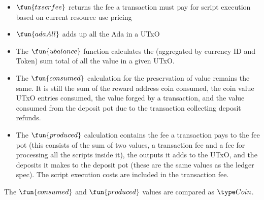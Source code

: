 \begin{itemize}
  \item $\fun{txscrfee}$ returns the fee a transaction must pay for script
  execution based on current resource use pricing

  \item $\fun{adaAll}$ adds up all the Ada in a UTxO

  \item
    The $\fun{ubalance}$ function calculates the (aggregated by currency ID and
    Token) sum total of all the value in a given UTxO.

  \item The $\fun{consumed}$ calculation for the preservation of value remains the
  same. It is still the sum of the reward address coin consumed, the coin value
   UTxO entries consumed, the value forged by a transaction,
   and the value consumed from the deposit pot due
   to the transaction collecting deposit refunds.

  \item The $\fun{produced}$ calculation contains the fee a transaction pays
  to the fee pot (this consists of the sum of two values, a transaction fee and a
  fee for processing all the scripts inside it), the outputs it adds to the UTxO,
  and the deposits it makes
  to the deposit pot (these are the same values as the ledger spec).
  The script execution costs are included in the transaction fee.
\end{itemize}

The $\fun{consumed}$ and $\fun{produced}$ values are compared as $\Coin$.

